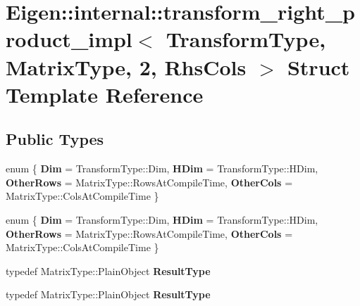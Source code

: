 \hypertarget{struct_eigen_1_1internal_1_1transform__right__product__impl_3_01_transform_type_00_01_matrix_type_00_012_00_01_rhs_cols_01_4}{}\section{Eigen\+:\+:internal\+:\+:transform\+\_\+right\+\_\+product\+\_\+impl$<$ Transform\+Type, Matrix\+Type, 2, Rhs\+Cols $>$ Struct Template Reference}
\label{struct_eigen_1_1internal_1_1transform__right__product__impl_3_01_transform_type_00_01_matrix_type_00_012_00_01_rhs_cols_01_4}
\subsection*{Public Types}
\begin{DoxyCompactItemize}
\item 
\mbox{\label{struct_eigen_1_1internal_1_1transform__right__product__impl_3_01_transform_type_00_01_matrix_type_00_012_00_01_rhs_cols_01_4_a0ae9704947aa16e3fc54b1d8079c25c2}} 
enum \{ {\bfseries Dim} = Transform\+Type\+:\+:Dim, 
{\bfseries H\+Dim} = Transform\+Type\+:\+:H\+Dim, 
{\bfseries Other\+Rows} = Matrix\+Type\+:\+:Rows\+At\+Compile\+Time, 
{\bfseries Other\+Cols} = Matrix\+Type\+:\+:Cols\+At\+Compile\+Time
 \}
\item 
\mbox{\label{struct_eigen_1_1internal_1_1transform__right__product__impl_3_01_transform_type_00_01_matrix_type_00_012_00_01_rhs_cols_01_4_a41b0e77ae6b611980a20eda91963271a}} 
enum \{ {\bfseries Dim} = Transform\+Type\+:\+:Dim, 
{\bfseries H\+Dim} = Transform\+Type\+:\+:H\+Dim, 
{\bfseries Other\+Rows} = Matrix\+Type\+:\+:Rows\+At\+Compile\+Time, 
{\bfseries Other\+Cols} = Matrix\+Type\+:\+:Cols\+At\+Compile\+Time
 \}
\item 
\mbox{\label{struct_eigen_1_1internal_1_1transform__right__product__impl_3_01_transform_type_00_01_matrix_type_00_012_00_01_rhs_cols_01_4_adfedcd76ea23ad81698c0e50b6db04e2}} 
typedef Matrix\+Type\+::\+Plain\+Object {\bfseries Result\+Type}
\item 
\mbox{\label{struct_eigen_1_1internal_1_1transform__right__product__impl_3_01_transform_type_00_01_matrix_type_00_012_00_01_rhs_cols_01_4_adfedcd76ea23ad81698c0e50b6db04e2}} 
typedef Matrix\+Type\+::\+Plain\+Object {\bfseries Result\+Type}
\end{DoxyCompactItemize}
